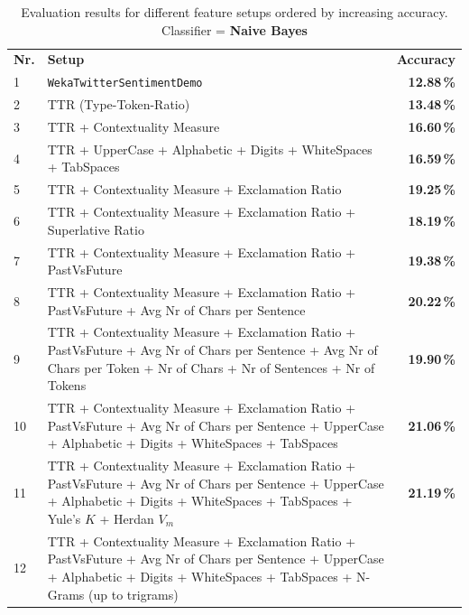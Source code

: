 \documentclass[journal, a4paper, 12pt]{IEEEtran}
\begin{document}
\begin{table}[!hbt]
	\begin{center}
		\caption{Evaluation results for different feature setups ordered by increasing accuracy. Classifier = \textbf{Naive Bayes}}
		\label{tab:results-nb}
		\begin{tabularx}{80mm}{| l | X | r |}
			\hline
			\rowcolor{lightgray}
			\multicolumn{3}{| c |}{\textbf{Naive Bayes}} 									\\ \hline
			\rowcolor{lightgray}
			\textbf{Nr.}		&	\textbf{Setup}					& \textbf{Accuracy}		\\ \hline\hline
			1			&	\texttt{WekaTwitterSentimentDemo}	& \textbf{12.88\,\%}		\\ \hline
			2			&	TTR 	(Type-Token-Ratio)			& \textbf{13.48\,\%}		\\ \hline
			3			&	TTR + Contextuality Measure			& \textbf{16.60\,\%}		\\ \hline
			4			&	TTR + UpperCase + Alphabetic + Digits + WhiteSpaces + TabSpaces
																& \textbf{16.59\,\%}		\\ \hline
			5			& 	TTR + Contextuality Measure + Exclamation Ratio
																& \textbf{19.25\,\%}		\\ \hline
			6			&	TTR + Contextuality Measure + Exclamation Ratio + Superlative Ratio
																& \textbf{18.19\,\%}		\\ \hline
			7			&	TTR + Contextuality Measure + Exclamation Ratio + PastVsFuture
																& \textbf{19.38\,\%}		\\ \hline
			8			&	TTR + Contextuality Measure + Exclamation Ratio + PastVsFuture + Avg Nr of Chars per Sentence
																& \textbf{20.22\,\%}		\\ \hline
			9			&	TTR + Contextuality Measure + Exclamation Ratio + PastVsFuture + Avg Nr of Chars per Sentence + Avg Nr of Chars per Token + Nr of Chars + Nr of Sentences + Nr of Tokens
																& \textbf{19.90\,\%}		\\ \hline
			10			&	TTR + Contextuality Measure + Exclamation Ratio + PastVsFuture + Avg Nr of Chars per Sentence + UpperCase + Alphabetic + Digits + WhiteSpaces + TabSpaces
																& \textbf{21.06\,\%}		\\ \hline
			11			&	TTR + Contextuality Measure + Exclamation Ratio + PastVsFuture + Avg Nr of Chars per Sentence + UpperCase + Alphabetic + Digits + WhiteSpaces + TabSpaces + Yule's $K$ + Herdan $V_m$
																& \textbf{21.19\,\%}		\\ \hline
			12			&	TTR + Contextuality Measure + Exclamation Ratio + PastVsFuture + Avg Nr of Chars per Sentence + UpperCase + Alphabetic + Digits + WhiteSpaces + TabSpaces + N-Grams (up to trigrams)

\end{tabularx}
\end{center}
\end{table}
\end{document}
